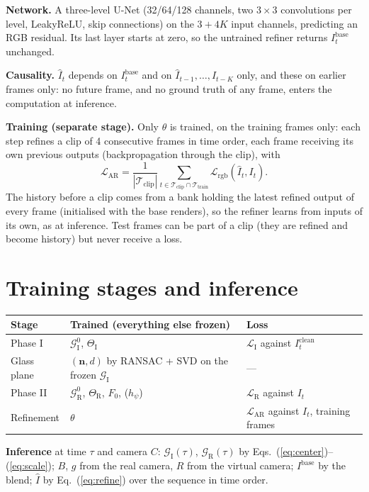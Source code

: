 \documentclass[10pt,a4paper]{article}
\newcommand{\GI}{\mathcal G_{\mathrm I}}
\newcommand{\GR}{\mathcal G_{\mathrm R}}
\newcommand{\nn}{\mathbf n}
\newcommand{\Ib}{I^{\mathrm{base}}}
\begin{document}
\textbf{Network.} A three-level U-Net (32/64/128 channels, two $3\times3$ convolutions per level, LeakyReLU, skip connections) on the $3+4K$ input channels, predicting an RGB residual. Its last layer starts at zero, so the untrained refiner returns $\Ib_t$ unchanged.

\textbf{Causality.} $\hat I_t$ depends on $\Ib_t$ and on $\hat I_{t-1},\dots,\hat I_{t-K}$ only, and these on earlier frames only: no future frame, and no ground truth of any frame, enters the computation at inference.

\textbf{Training (separate stage).} Only $\theta$ is trained, on the training frames only: each step refines a clip of 4 consecutive frames in time order, each frame receiving its own previous outputs (backpropagation through the clip), with
\begin{equation}
\mathcal L_{\mathrm{AR}}=\frac{1}{|\mathcal T_{\mathrm{clip}}|}\sum_{t\in\mathcal T_{\mathrm{clip}}\cap\mathcal T_{\mathrm{train}}}\mathcal L_{\mathrm{rgb}}(\hat I_t,I_t).
\end{equation}
The history before a clip comes from a bank holding the latest refined output of every frame (initialised with the base renders), so the refiner learns from inputs of its own, as at inference. Test frames can be part of a clip (they are refined and become history) but never receive a loss.

\section{Training stages and inference}
\begin{tabularx}{\textwidth}{@{}lXl@{}}
\toprule
Stage & Trained (everything else frozen) & Loss \\ \midrule
Phase I & $\GI^0$, $\Theta_{\mathrm I}$ & $\mathcal L_{\mathrm I}$ against $I_t^{\mathrm{clean}}$ \\
Glass plane & $(\nn,d)$ by RANSAC + SVD on the frozen $\GI$ & --- \\
Phase II & $\GR^0$, $\Theta_{\mathrm R}$, $F_0$, ($h_\psi$) & $\mathcal L_{\mathrm R}$ against $I_t$ \\
Refinement & $\theta$ & $\mathcal L_{\mathrm{AR}}$ against $I_t$, training frames \\ \bottomrule
\end{tabularx}

\textbf{Inference} at time $\tau$ and camera $C$: $\GI(\tau)$, $\GR(\tau)$ by Eqs.~(\ref{eq:center})--(\ref{eq:scale}); $B$, $g$ from the real camera, $R$ from the virtual camera; $\Ib$ by the blend; $\hat I$ by Eq.~(\ref{eq:refine}) over the sequence in time order.
\end{document}
